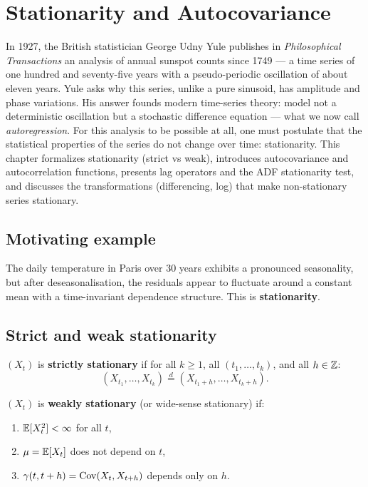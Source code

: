 \chapter{Stationarity and Autocovariance}
\label{ch:stationnarite}

In 1927, the British statistician George Udny Yule publishes in \emph{Philosophical Transactions} an analysis of annual sunspot counts since 1749 --- a time series of one hundred and seventy-five years with a pseudo-periodic oscillation of about eleven years. Yule asks why this series, unlike a pure sinusoid, has amplitude and phase variations. His answer founds modern time-series theory: model not a deterministic oscillation but a stochastic difference equation --- what we now call \emph{autoregression}. For this analysis to be possible at all, one must postulate that the statistical properties of the series do not change over time: stationarity. This chapter formalizes stationarity (strict vs weak), introduces autocovariance and autocorrelation functions, presents lag operators and the ADF stationarity test, and discusses the transformations (differencing, log) that make non-stationary series stationary.

\section{Motivating example}
The daily temperature in Paris over 30 years exhibits a pronounced seasonality, but after deseasonalisation, the residuals appear to fluctuate around a constant mean with a time-invariant dependence structure. This is \textbf{stationarity}.

\section{Strict and weak stationarity}

\begin{definition}
$(X_t)$ is \textbf{strictly stationary} if for all $k\geq 1$, all $(t_1,\ldots,t_k)$, and all $h\in\mathbb{Z}$:
\[
(X_{t_1},\ldots,X_{t_k}) \stackrel{d}{=} (X_{t_1+h},\ldots,X_{t_k+h}).
\]
\end{definition}

\begin{definition}
$(X_t)$ is \textbf{weakly stationary} (or wide-sense stationary) if:
\begin{enumerate}
\item $\mathbb{E}[X_t^2]<\infty$ for all $t$,
\item $\mu = \mathbb{E}[X_t]$ does not depend on $t$,
\item $\gamma(t,t+h) = \operatorname{Cov}(X_t,X_{t+h})$ depends only on $h$.
\end{enumerate}
\end{definition}


